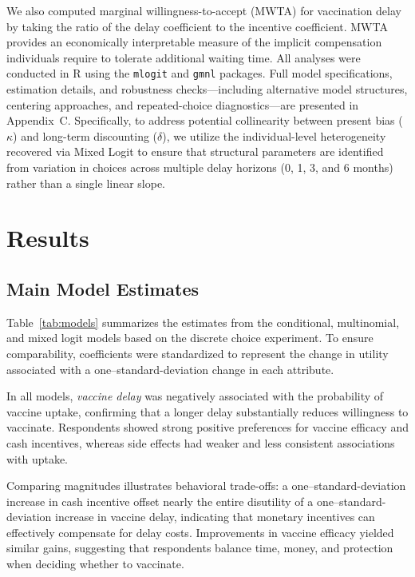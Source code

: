 \documentclass[preprint,12pt]{elsarticle}
\begin{document}
We also computed marginal willingness-to-accept (MWTA) for vaccination delay by taking the ratio of the delay coefficient to the incentive coefficient. MWTA provides an economically interpretable measure of the implicit compensation individuals require to tolerate additional waiting time. All analyses were conducted in R using the \texttt{mlogit} and \texttt{gmnl} packages. Full model specifications, estimation details, and robustness checks—including alternative model structures, centering approaches, and repeated-choice diagnostics—are presented in Appendix~C. Specifically, to address potential collinearity between present bias ($\kappa$) and long-term discounting ($\delta$), we utilize the individual-level heterogeneity recovered via Mixed Logit to ensure that structural parameters are identified from variation in choices across multiple delay horizons (0, 1, 3, and 6 months) rather than a single linear slope.

\clearpage

\section{Results}\label{sec:results}

\subsection{Main Model Estimates}

Table~\ref{tab:models} summarizes the estimates from the conditional, multinomial, and mixed logit models based on the discrete choice experiment. To ensure comparability, coefficients were standardized to represent the change in utility associated with a one–standard-deviation change in each attribute.

In all models, \textit{vaccine delay} was negatively associated with the probability of vaccine uptake, confirming that a longer delay substantially reduces willingness to vaccinate. Respondents showed strong positive preferences for vaccine efficacy and cash incentives, whereas side effects had weaker and less consistent associations with uptake.


Comparing magnitudes illustrates behavioral trade-offs: a one–standard-deviation increase in cash incentive offset nearly the entire disutility of a one–standard-deviation increase in vaccine delay, indicating that monetary incentives can effectively compensate for delay costs. Improvements in vaccine efficacy yielded similar gains, suggesting that respondents balance time, money, and protection when deciding whether to vaccinate.
\end{document}
